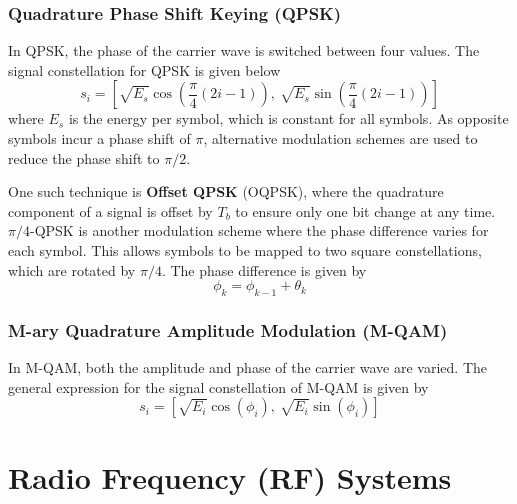 \documentclass{article}
\begin{document}
\subsubsection{Quadrature Phase Shift Keying (QPSK)}
In QPSK, the phase of the carrier wave is switched between four values.
The signal constellation for QPSK is given below
\begin{equation*}
    s_i = \left[ \sqrt{E_s} \cos{\left( \frac{\pi}{4} \left( 2i - 1 \right) \right)},\: \sqrt{E_s} \sin{\left( \frac{\pi}{4} \left( 2i - 1 \right) \right)} \right]
\end{equation*}
where \(E_s\) is the energy per symbol, which is constant for all
symbols. As opposite symbols incur a phase shift of \(\pi\), alternative
modulation schemes are used to reduce the phase shift to \(\pi / 2\).

One such technique is \textbf{Offset QPSK} (OQPSK), where the
quadrature component of a signal is offset by \(T_b\) to ensure only
one bit change at any time. \(\pi/4\)-QPSK is another modulation scheme
where the phase difference varies for each symbol. This allows symbols
to be mapped to two square constellations, which are rotated by
\(\pi/4\). The phase difference is given by
\begin{equation*}
    \phi_k = \phi_{k - 1} + \theta_k
\end{equation*}
\subsubsection{M-ary Quadrature Amplitude Modulation (M-QAM)}
In M-QAM, both the amplitude and phase of the carrier wave are varied.
The general expression for the signal constellation of M-QAM is given
by
\begin{equation*}
    s_i = \left[ \sqrt{E_i} \cos{\left( \phi_i \right)},\: \sqrt{E_i} \sin{\left( \phi_i \right)} \right]
\end{equation*}
\section{Radio Frequency (RF) Systems}
\end{document}
